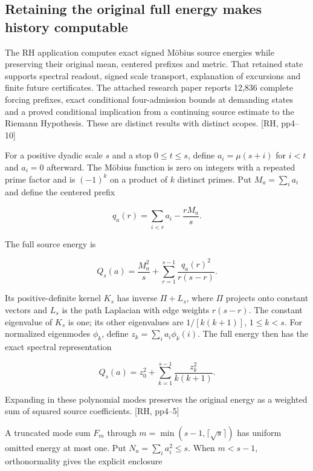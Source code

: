 \label{signed-arithmetic-energy-and-conditional-continuation}

\subsection{Retaining the original full energy makes history computable}\label{retaining-the-original-full-energy-makes-history-computable}

The RH application computes exact signed Möbius source energies while preserving their original mean, centered prefixes and metric. That retained state supports spectral readout, signed scale transport, explanation of excursions and finite future certificates. The attached research paper reports 12,836 complete forcing prefixes, exact conditional four-admission bounds at demanding states and a proved conditional implication from a continuing source estimate to the Riemann Hypothesis. These are distinct results with distinct scopes. {[}RH, pp4--10{]}

For a positive dyadic scale \(s\) and a stop \(0\le t\le s\), define \(a_i=\mu(s+i)\) for \(i<t\) and \(a_i=0\) afterward. The Möbius function is zero on integers with a repeated prime factor and is \((-1)^k\) on a product of \(k\) distinct primes. Put \(M_a=\sum_i a_i\) and define the centered prefix

\[
q_a(r)=\sum_{i<r}a_i-\frac{rM_a}{s}.
\]

The full source energy is

\[
Q_s(a)=\frac{M_a^2}{s}+\sum_{r=1}^{s-1}\frac{q_a(r)^2}{r(s-r)}.
\]

Its positive-definite kernel \(K_s\) has inverse \(\Pi+L_s\), where \(\Pi\) projects onto constant vectors and \(L_s\) is the path Laplacian with edge weights \(r(s-r)\). The constant eigenvalue of \(K_s\) is one; its other eigenvalues are \(1/[k(k+1)]\), \(1\le k<s\). For normalized eigenmodes \(\phi_k\), define \(z_k=\sum_i a_i\phi_k(i)\). The full energy then has the exact spectral representation

\[
Q_s(a)=z_0^2+\sum_{k=1}^{s-1}\frac{z_k^2}{k(k+1)}.
\]

Expanding in these polynomial modes preserves the original energy as a weighted sum of squared source coefficients. {[}RH, pp4--5{]}

A truncated mode sum \(F_m\) through \(m=\min(s-1,\lceil\sqrt s\rceil)\) has uniform omitted energy at most one. Put \(N_a=\sum_i a_i^2\le s\). When \(m<s-1\), orthonormality gives the explicit enclosure

